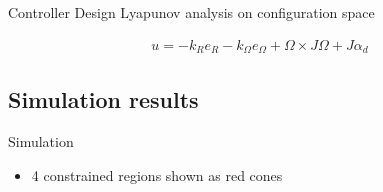 \documentclass[11pt,professionalfonts]{beamer}
\begin{document}
\begin{frame}{Controller Design}
	Lyapunov analysis on configuration space
	
			\begin{align*}
			u = - k_R e_R - k_{\Omega} e_{\Omega} + \Omega \times J \Omega + J \alpha_d
		\end{align*}
		
\end{frame}

\subsection{Simulation results}
\begin{frame}{Simulation} %
\begin{itemize}
	\item 4 constrained regions shown as red cones
\end{itemize}

\end{frame}%
\end{document}
